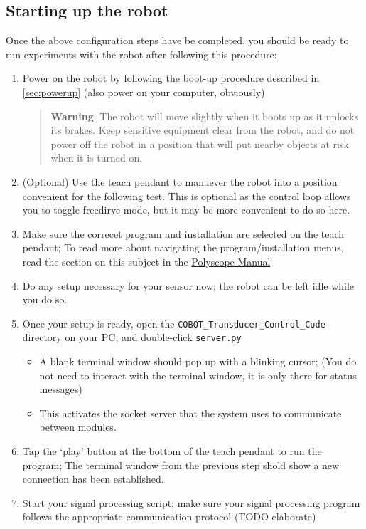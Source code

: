 \documentclass[11pt]{article}
\begin{document}
\subsection{Starting up the robot}
Once the above configuration steps have be completed, you should be ready to run experiments with the robot after following this procedure:
\begin{enumerate}
    \item Power on the robot by following the boot-up procedure described in \autoref{sec:powerup} (also power on your computer, obviously)
    \begin{quotation}
        \textbf{Warning}: The robot will move slightly when it boots up as it unlocks its brakes. Keep sensitive equipment clear from the robot, and do not power off the robot in a position that will put nearby objects at risk when it is turned on.
    \end{quotation}
    \item (Optional) Use the teach pendant to manuever the robot into a position convenient for the following test. This is optional as the control loop allows you to toggle freedirve mode, but it may be more convenient to do so here.
    \item Make sure the correcet program and installation are selected on the teach pendant; To read more about navigating the program/installation menus, read the section on this subject in the \hyperlink{https://s3-eu-west-1.amazonaws.com/ur-support-site/44018/Software_Manual_en_Global.pdf\#page=103}{Polyscope Manual}
    \item Do any setup necessary for your sensor now; the robot can be left idle while you do so.
    \item Once your setup is ready, open the \texttt{COBOT\_Transducer\_Control\_Code} directory on your PC, and double-click \texttt{server.py}
    \begin{itemize}
        \item A blank terminal window should pop up with a blinking cursor; (You do not need to interact with the terminal window, it is only there for status messages)
        \item This activates the socket server that the system uses to communicate between modules.
    \end{itemize}
    \item Tap the `play' button at the bottom of the teach pendant to run the program; The terminal window from the previous step shold show a new connection has been established.
    \item Start your signal processing script; make sure your signal processing program follows the appropriate communication protocol (TODO elaborate)

\end{enumerate}
\end{document}
